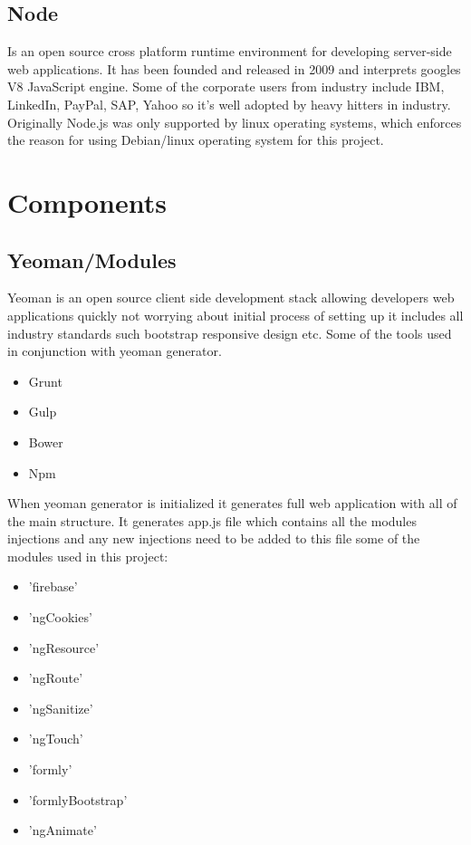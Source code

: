 \subsection{Node}
\bigbreak
Is an open source cross platform runtime environment for developing server-side web applications. It has been founded and released in 2009 and interprets googles V8 JavaScript engine. Some of the corporate users from industry include IBM, LinkedIn, PayPal, SAP, Yahoo so it’s well adopted by heavy hitters in industry. Originally Node.js was only supported by linux operating systems, which enforces the reason for using Debian/linux operating system for this project.


\section{Components}
\subsection{Yeoman/Modules}
\bigbreak
Yeoman is an open source client side development stack allowing developers web applications quickly not worrying about initial process of setting up it includes all industry standards such bootstrap responsive design etc. Some of the tools used in conjunction with yeoman generator.

\begin{itemize}

	\item Grunt 
	\item Gulp
	\item Bower
	\item Npm

\end{itemize}

When yeoman generator is initialized it generates full web application with all of the main structure. 
It generates app.js file which contains all the modules injections and any new injections need to be added to this file some of the modules used in this project:

\begin{itemize}
	
	\item 'firebase' 
	\item 'ngCookies'
	\item 'ngResource'
	\item 'ngRoute'
	\item 'ngSanitize' 
	\item 'ngTouch'
	\item 'formly'
	\item 'formlyBootstrap'
	\item 'ngAnimate'
	
\end{itemize}
\bigbreak

